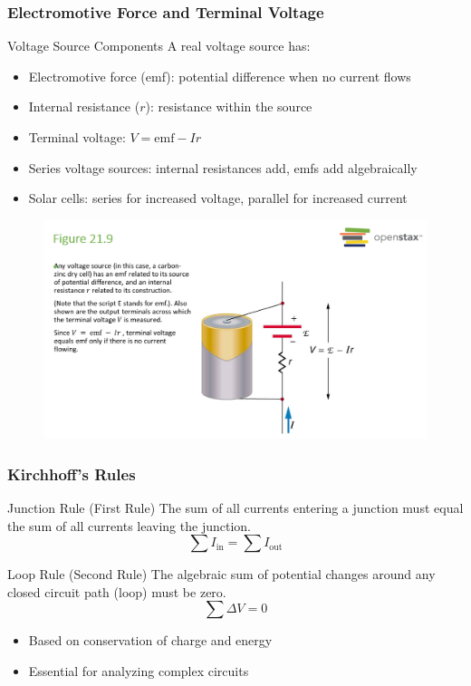 \documentclass{beamer}
\begin{document}
\begin{frame}
    \frametitle{Electromotive Force and Terminal Voltage}
    \begin{block}{Voltage Source Components}
        A real voltage source has:
        \begin{itemize}
            \item Electromotive force (emf): potential difference when no current flows
            \item Internal resistance ($r$): resistance within the source
        \end{itemize}
    \end{block}
    \begin{itemize}
        \item Terminal voltage: $V = \text{emf} - Ir$
        \item Series voltage sources: internal resistances add, emfs add algebraically
        \item Solar cells: series for increased voltage, parallel for increased current
    \end{itemize}
    
\end{frame}
\begin{frame}
\begin{figure}
    \centering
    \includegraphics[width=1\linewidth]{phys12-circuits-internal-resistance.png}
\end{figure}
\end{frame}
\begin{frame}
    \frametitle{Kirchhoff's Rules}
    \begin{block}{Junction Rule (First Rule)}
        The sum of all currents entering a junction must equal the sum of all currents leaving the junction.
        \[ \sum I_{\text{in}} = \sum I_{\text{out}} \]
    \end{block}
    \begin{block}{Loop Rule (Second Rule)}
        The algebraic sum of potential changes around any closed circuit path (loop) must be zero.
        \[ \sum \Delta V = 0 \]
    \end{block}
    \begin{itemize}
        \item Based on conservation of charge and energy
        \item Essential for analyzing complex circuits
    \end{itemize}
    \end{frame}
\end{document}
